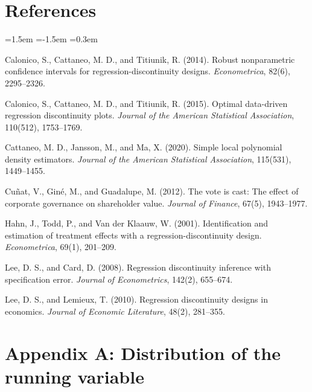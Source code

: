 \documentclass[12pt]{article}
\begin{document}
\section*{References}
\begin{list}{}{\leftmargin=1.5em \itemindent=-1.5em \itemsep=0.3em \parsep=0pt}
\item Calonico, S., Cattaneo, M. D., and Titiunik, R. (2014). Robust nonparametric confidence intervals for regression-discontinuity designs. \emph{Econometrica}, 82(6), 2295--2326.
\item Calonico, S., Cattaneo, M. D., and Titiunik, R. (2015). Optimal data-driven regression discontinuity plots. \emph{Journal of the American Statistical Association}, 110(512), 1753--1769.
\item Cattaneo, M. D., Jansson, M., and Ma, X. (2020). Simple local polynomial density estimators. \emph{Journal of the American Statistical Association}, 115(531), 1449--1455.
\item Cu\~nat, V., Gin\'e, M., and Guadalupe, M. (2012). The vote is cast: The effect of corporate governance on shareholder value. \emph{Journal of Finance}, 67(5), 1943--1977.
\item Hahn, J., Todd, P., and Van der Klaauw, W. (2001). Identification and estimation of treatment effects with a regression-discontinuity design. \emph{Econometrica}, 69(1), 201--209.
\item Lee, D. S., and Card, D. (2008). Regression discontinuity inference with specification error. \emph{Journal of Econometrics}, 142(2), 655--674.
\item Lee, D. S., and Lemieux, T. (2010). Regression discontinuity designs in economics. \emph{Journal of Economic Literature}, 48(2), 281--355.
\end{list}

\clearpage
\appendix
\section*{Appendix A: Distribution of the running variable}
\end{document}
